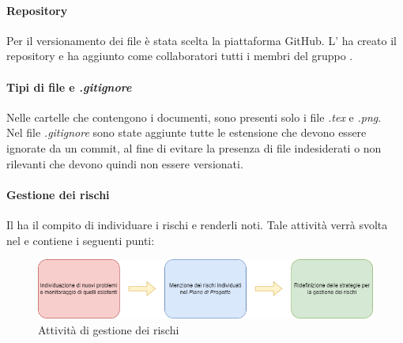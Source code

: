 \paragraph{Repository}
Per il versionamento dei file è stata scelta la piattaforma GitHub\glo{}. L'\roleAdministratorLow{} ha creato il repository\glo{} e ha aggiunto
come collaboratori tutti i membri del gruppo \groupName{}.

\paragraph{Tipi di file e \textit{.gitignore}}
Nelle cartelle che contengono i documenti, sono presenti solo i file \textit{.tex} e \textit{.png}.\\
Nel file \textit{.gitignore} sono state aggiunte tutte le estensione che devono essere ignorate da un commit, al fine di evitare la presenza di file indesiderati
o non rilevanti che devono quindi non essere versionati.
\paragraph {Gestione dei rischi}
Il \roleProjectManagerLow{} ha il compito di individuare i rischi e renderli noti. Tale attività verrà svolta nel \docNamePdPLow{} e contiene i seguenti punti:
\begin{figure}[htbp]
\centering
\includegraphics[scale =0.65]{../template/images/NdP/GestioneRischi.png}
\caption{Attività di gestione dei rischi}
\end {figure}

